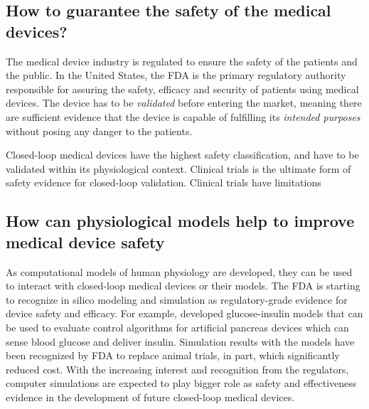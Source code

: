 \subsection{How to guarantee the safety of the medical devices?}
The medical device industry is regulated to ensure the safety of the patients and the public. In the United States, the FDA is the primary regulatory authority responsible for assuring the safety, efficacy and security of patients using medical devices. The device has to be \emph{validated} before entering the market, meaning there are sufficient evidence that the device is capable of fulfilling its \emph{intended purposes} without posing any danger to the patients.

Closed-loop medical devices have the highest safety classification, and have to be validated within its physiological context.
Clinical trials is the ultimate form of safety evidence for closed-loop validation.
Clinical trials have limitations
	

\subsection{How can physiological models help to improve medical device safety}
As computational models of human physiology are developed, they can be used to interact with closed-loop medical devices or their models. The FDA is starting to recognize in silico modeling and simulation as regulatory-grade evidence for device safety and efficacy. For example, \cite{pancreas_paul} developed glucose-insulin models that can be used to evaluate control algorithms for artificial pancreas devices which can sense blood glucose and deliver insulin. Simulation results with the models have been recognized by FDA to replace animal trials, in part, which significantly reduced cost. With the increasing interest and recognition from the regulators, computer simulations are expected to play bigger role as safety and effectiveness evidence in the development of future closed-loop medical devices.

